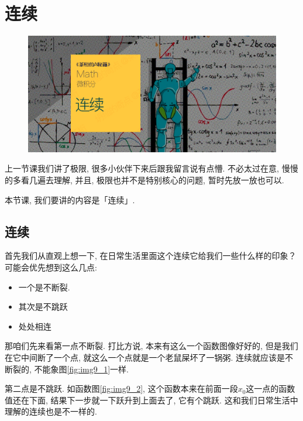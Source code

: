 \chapter{连续}

\begin{figure}[ht]
  \centering
  \includegraphics[width=1\textwidth]{asset/茶桁的AI秘籍_Math_8.png}
\end{figure}

\newpage

上一节课我们讲了极限, 很多小伙伴下来后跟我留言说有点懵. 不必太过在意, 慢慢的多看几遍去理解, 并且, 极限也并不是特别核心的问题, 暂时先放一放也可以. 

本节课, 我们要讲的内容是「连续」. 

\section{连续}

首先我们从直观上想一下, 在日常生活里面这个连续它给我们一些什么样的印象？可能会优先想到这么几点: 

\begin{itemize}
  \item 一个是不断裂. 
  \item 其次是不跳跃
  \item 处处相连
\end{itemize}

那咱们先来看第一点不断裂. 打比方说, 本来有这么一个函数图像好好的, 但是我们在它中间断了一个点, 就这么一个点就是一个老鼠屎坏了一锅粥. 连续就应该是不断裂的, 不能象图\ref{fig:img9_1}一样.

第二点是不跳跃. 如函数图\ref{fig:img9_2}, 这个函数本来在前面一段$x_0$这一点的函数值还在下面, 结果下一步就一下跃升到上面去了, 它有个跳跃. 这和我们日常生活中理解的连续也是不一样的. 

